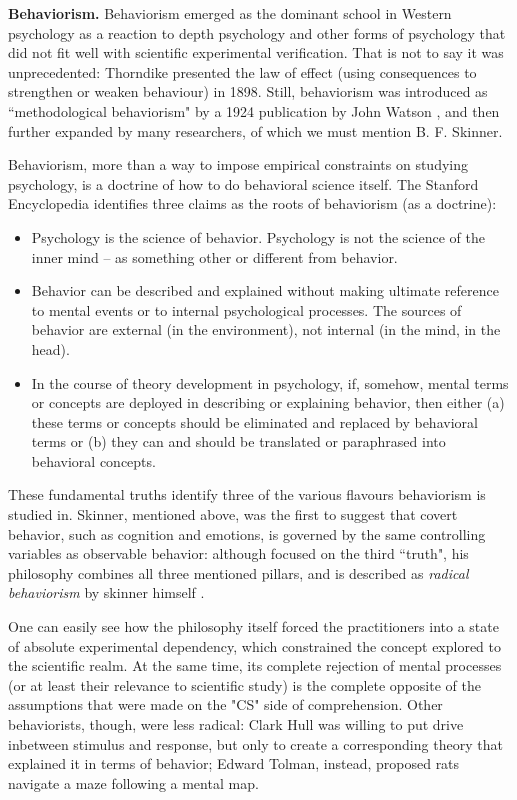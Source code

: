 \documentclass[../main.tex]{subfiles}
\begin{document}
\vspace{4pt}
\textbf{Behaviorism.} Behaviorism emerged as the dominant school in Western psychology as a reaction to depth psychology and other forms of psychology that did not fit well with scientific experimental verification. That is not to say it was unprecedented: Thorndike presented the law of effect (using consequences to strengthen or weaken behaviour) in 1898. Still, behaviorism was introduced as ``methodological behaviorism" by a 1924 publication by John Watson \cite{watsonUnverbalizedHumanBehavior1924}, and then further expanded by many researchers, of which we must mention B. F. Skinner.

Behaviorism, more than a way to impose empirical constraints on studying psychology, is a doctrine of how to do behavioral science itself. The Stanford Encyclopedia identifies three claims as the roots of behaviorism (as a doctrine):
\begin{itemize}
    \item Psychology is the science of behavior. Psychology is not the science of the inner mind – as something other or different from behavior.
    \item Behavior can be described and explained without making ultimate reference to mental events or to internal psychological processes. The sources of behavior are external (in the environment), not internal (in the mind, in the head).
    \item In the course of theory development in psychology, if, somehow, mental terms or concepts are deployed in describing or explaining behavior, then either (a) these terms or concepts should be eliminated and replaced by behavioral terms or (b) they can and should be translated or paraphrased into behavioral concepts.
\end{itemize}
These fundamental truths identify three of the various flavours behaviorism is studied in. Skinner, mentioned above, was the first to suggest that covert behavior, such as cognition and emotions, is governed by the same controlling variables as observable behavior: although focused on the third ``truth", his philosophy combines all three mentioned pillars, and is described as \textit{radical behaviorism} by skinner himself \cite{skinnerBehaviorism1974}.

One can easily see how the philosophy itself forced the practitioners into a state of absolute experimental dependency, which constrained the concept explored to the scientific realm. At the same time, its complete rejection of mental processes (or at least their relevance to scientific study) is the complete opposite of the assumptions that were made on the "CS" side of comprehension. Other behaviorists, though, were less radical: Clark Hull was willing to put drive inbetween stimulus and response, but only to create a corresponding theory that explained it in terms of behavior\cite{hullGoalAttractionDirecting1931}; Edward Tolman, instead, proposed rats navigate a maze following a mental map\cite{tolmanCognitiveMapsRats1948}.
\end{document}
